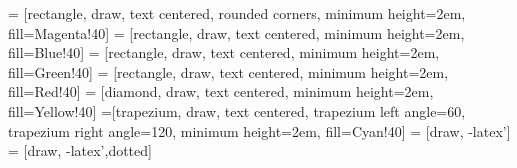 \newcommand{\makeTechTitlecard}{
	\chapter*{Titelblad}
	\begin{table}[h]
	\center
	\begin{tabularx}{\textwidth}{p{.3\linewidth} X}
	\textbf{Deltagere}		&	\writer{}												\\
	\textbf{Projektnavn} 	&	\projectName{}											\\
	\textbf{Skole}			&	Aarhus Tech \newline{} Hasselager Allé 2, 8260 Viby J	    \\
	\textbf{Projektperiode}	&	\formatdate{13}{11}{2023} - \formatdate{15}{12}{2023}		\\
	\textbf{Afleveringsdato}&	\formatdate{8}{12}{2023}									\\
	\textbf{Vejleder}		&	\advisor{}												\\
	\end{tabularx}
	\end{table}
	\section*{Underskrifter}
	\vspace{3\baselineskip}
	\hrule
	\noindent\small \writer{} \null\hfill Dato\\
	\vspace{2\baselineskip}
	\hrule
	\noindent\small \advisorOne{} \null\hfill Dato\\
	\vspace{2\baselineskip}
	\hrule
	\noindent\small \advisorTwo{} \null\hfill Dato\\
}


 = [rectangle, draw, text centered, rounded corners, minimum height=2em, fill=Magenta!40]
 = [rectangle, draw, text centered, minimum height=2em, fill=Blue!40]
 = [rectangle, draw, text centered, minimum height=2em, fill=Green!40]
 = [rectangle, draw, text centered, minimum height=2em, fill=Red!40]
 = [diamond, draw, text centered, minimum height=2em, fill=Yellow!40]
=[trapezium, draw, text centered, trapezium left angle=60, trapezium right angle=120, minimum height=2em, fill=Cyan!40]
 = [draw, -latex']
 = [draw, -latex',dotted]